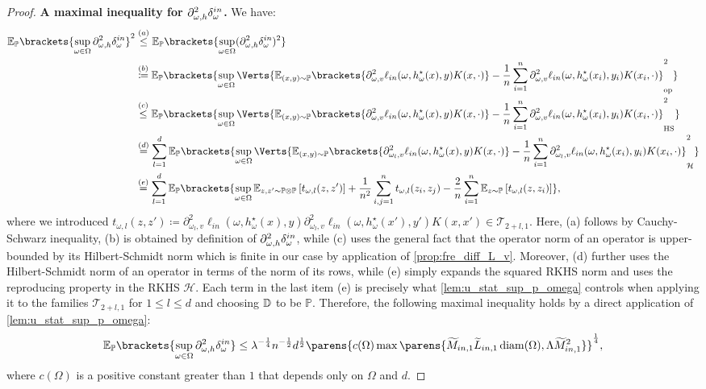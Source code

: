 \begin{proof}
{\bf A maximal inequality for $\partial_{\omega,h}^2\delta_\omega^{in}$.} We have:
\begin{align*}
	\mathbb{E}_{\mathbb{P}}\brackets{\sup_{\omega\in \Omega} \Dinwh }^2
	&\stackrel{(a)}{\leq} \mathbb{E}_{\mathbb{P}}\brackets{\sup_{\omega\in \Omega} (\Dinwh)^2 }\\
	&\stackrel{(b)}{\coloneqq} \mathbb{E}_{\mathbb{P}}\brackets{ \sup_{\omega\in \Omega} \Verts{ \mathbb{E}_{(x,y)\sim \mathbb{P}}\brackets{\partial_{\omega,v}^2\ell_{in}(\omega,h_{\omega}^{\star}(x),y)K(x,\cdot)} - \frac{1}{n}\sum_{i=1}^n \partial_{\omega,v}^2\ell_{in}(\omega,h_{\omega}^{\star}(x_i),y_i)K(x_i,\cdot) }_{\op}^2 }\\
	&\stackrel{(c)}{\leq}\mathbb{E}_{\mathbb{P}}\brackets{ \sup_{\omega\in \Omega} \Verts{ \mathbb{E}_{(x,y)\sim \mathbb{P}}\brackets{\partial_{\omega,v}^2\ell_{in}(\omega,h_{\omega}^{\star}(x),y)K(x,\cdot)} - \frac{1}{n}\sum_{i=1}^n \partial_{\omega,v}^2\ell_{in}(\omega,h_{\omega}^{\star}(x_i),y_i)K(x_i,\cdot) }_{\hs}^2 }\\
	&\stackrel{(d)}{=}\sum_{l=1}^d \mathbb{E}_{\mathbb{P}}\brackets{ \sup_{\omega\in \Omega} \Verts{ \mathbb{E}_{(x,y)\sim \mathbb{P}}\brackets{\partial_{\omega_l,v}^2\ell_{in}(\omega,h_{\omega}^{\star}(x),y)K(x,\cdot)} - \frac{1}{n}\sum_{i=1}^n \partial_{\omega_l,v}^2\ell_{in}(\omega,h_{\omega}^{\star}(x_i),y_i)K(x_i,\cdot) }_{\mathcal{H}}^2 }\\
	&\stackrel{(e)}{=} \sum_{l=1}^d \mathbb{E}_{\mathbb{P}}\brackets{ \sup_{\omega\in \Omega} \mathbb{E}_{z,z'\sim\mathbb{P}\otimes\mathbb{P}}\left[t_{\omega,l}(z,z')\right]+\frac{1}{n^2}\sum_{i,j=1}^n t_{\omega,l}(z_i,z_j)-\frac{2}{n}\sum_{i=1}^n\mathbb{E}_{z\sim\mathbb{P}}\left[t_{\omega,l}(z,z_i)\right]},
\end{align*}
where we introduced $t_{\omega,l}(z,z') \coloneqq \partial_{\omega_l,v}^2\ell_{in}(\omega,h_{\omega}^{\star}(x),y)\partial_{\omega_l,v}^2\ell_{in}(\omega,h_{\omega}^{\star}(x'),y')K(x,x')\in \mathcal{T}_{2+l,1}$. Here, (a) follows by Cauchy-Schwarz inequality, (b) is obtained by definition of $\partial_{\omega,h}^2\delta_\omega^{in}$, while (c) uses the general fact that the operator norm of an operator is upper-bounded by its Hilbert-Schmidt norm which is finite in our case by application of \cref{prop:fre_diff_L_v}. Moreover, (d) further uses the Hilbert-Schmidt norm of an operator  in terms of the norm of its rows, while (e) simply expands the squared RKHS norm and uses the reproducing property in the RKHS $\mathcal{H}$. Each term in the last item (e) is precisely what \cref{lem:u_stat_sup_p_omega} controls when applying it to the families $\mathcal{T}_{2+l,1}$ for $1\leq l\leq d$ and choosing $\mathbb{D}$ to be $\mathbb{P}$.  Therefore, the following maximal inequality holds by a direct application of \cref{lem:u_stat_sup_p_omega}:
 \begin{align*}
 	\mathbb{E}_{\mathbb{P}}\brackets{\sup_{\omega\in \Omega} \Dinwh }\leq 
 	\lambda^{-\frac{1}{4}}n^{-\frac{1}{2}}d^{\frac{1}{2}} \parens{c(\Omega)\max\parens{\widetilde{M}_{in,1}\widetilde{L}_{in,1}\diam(\Omega),\Lambda\widetilde{M}_{in,1}^2}}^{\frac{1}{4}},
 \end{align*}
 where $c(\Omega)$ is a positive constant greater than $1$ that depends only on $\Omega$ and $d$.


\end{proof}
